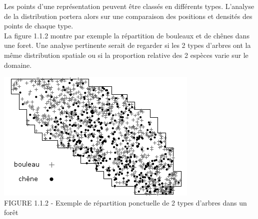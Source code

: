 \documentclass[french,12pt,a4paper]{report}
\begin{document}
\begin{minipage}[c]{0.45\linewidth}
 Les points d'une représentation peuvent être classés en différents types. L'analyse de la distribution portera alors sur une comparaison des positions et densités des points de chaque type.\\
 
La figure 1.1.2 montre par exemple la répartition de bouleaux et de chênes dans une foret. Une analyse pertinente serait de regarder si les 2 types d'arbres ont la même distribution spatiale ou si la proportion relative des 2 espèces varie sur le domaine.
\end{minipage}
\hfill
\begin{minipage}[c]{0.45\linewidth}
\includegraphics[scale=0.6]{images/diffPoints.png}\\
\small{FIGURE 1.1.2 - Exemple de répartition ponctuelle de 2 types d'arbres dans un forêt}
\end{minipage}

\end{document}
